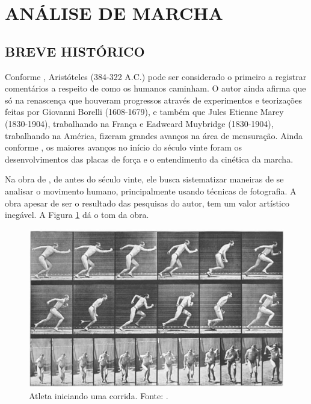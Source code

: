 \section{ANÁLISE DE MARCHA}


\subsection{BREVE HISTÓRICO} 

Conforme , Aristóteles (384-322 A.C.) pode ser considerado o primeiro a registrar comentários a respeito de como os humanos caminham. 
O autor ainda afirma que só na renascença que houveram progressos através de experimentos e teorizações feitas por Giovanni Borelli (1608-1679), e também que Jules Etienne Marey (1830-1904), trabalhando na França e Eadweard Muybridge (1830-1904), trabalhando na América, fizeram grandes avanços na área de mensuração.
Ainda conforme , os maiores avanços no início do século vinte foram os desenvolvimentos das placas de força e o entendimento da cinética da marcha.

Na obra de , de antes do século vinte, ele busca sistematizar maneiras de se analisar o movimento humano, principalmente usando técnicas de fotografia. 
A obra apesar de ser o resultado das pesquisas do autor, tem um valor artístico inegável.  
A Figura \ref{inicio_corrida} dá o tom da obra.

\begin{figure}[ht]
	\centering
	\includegraphics[width=15cm]{figuras/inicio_corrida.eps}
	\caption{Atleta iniciando uma corrida. Fonte: .}
	\label{inicio_corrida}
\end{figure}


